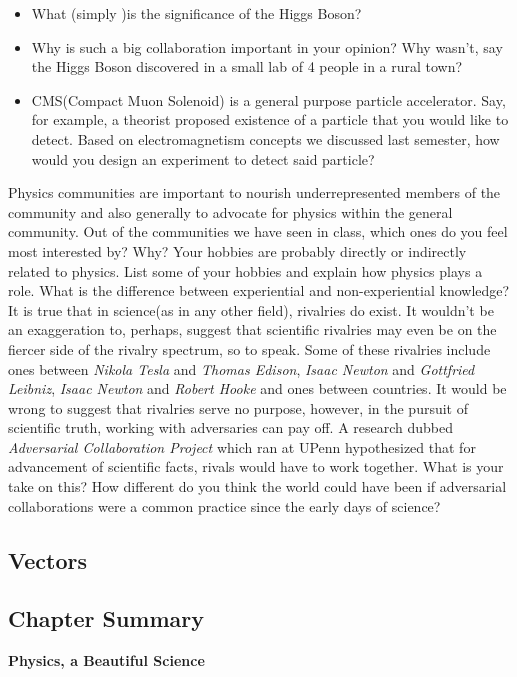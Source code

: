 \documentclass[12pt,addpoints]{exam}
\begin{document}
\begin{questions}
		\begin{itemize}
			\item What (simply )is the significance of the Higgs Boson? \vspace{0.5in}
			\item Why is such a big collaboration important in your opinion? Why wasn't, say the Higgs Boson discovered in a small lab of 4 people in a rural town? \\ \vspace{2in}
			\item CMS(Compact Muon Solenoid) is a general purpose particle accelerator. Say, for example, a theorist proposed existence of a particle that you would like to detect. Based on electromagnetism concepts we discussed last semester, how would you design an experiment to detect said particle?\vspace{2in}
		\end{itemize}
		\question Physics communities are important to nourish underrepresented members of the community and also generally to advocate for physics within the general community. Out of the communities we have seen in class, which ones do you feel most interested by? Why? \vspace{1in}
		\question Your hobbies are probably directly or indirectly related to physics. List some of your hobbies and explain how physics plays a role. \vspace{2in}
		\question What is the difference between experiential and non-experiential knowledge?\vspace{1in}
		\question It is true that in science(as in any other field), rivalries do exist. It wouldn't be an exaggeration to, perhaps, suggest that scientific rivalries may even be on the fiercer side of the rivalry spectrum, so to speak. Some of these rivalries include ones between \textit{Nikola Tesla} and \textit{Thomas Edison}, \textit{Isaac Newton} and \textit{Gottfried Leibniz}, \textit{Isaac Newton} and \textit{Robert Hooke} and ones between countries. It would be wrong to suggest that rivalries serve no purpose, however, in the pursuit of scientific truth, working with adversaries can pay off. A research  dubbed \textit{Adversarial Collaboration Project} which ran at UPenn hypothesized that for advancement of scientific facts, rivals would have to work together. What is your take on this? How different do you think the world could have been if adversarial collaborations were a common practice since the early days of science?\vspace{3in}
		\begin{center}
			\section*{Vectors}
			\subsection*{Chapter Summary}
			\textbf{Physics, a Beautiful Science} 
		\end{center}
		
	\end{questions}		
\end{document}

